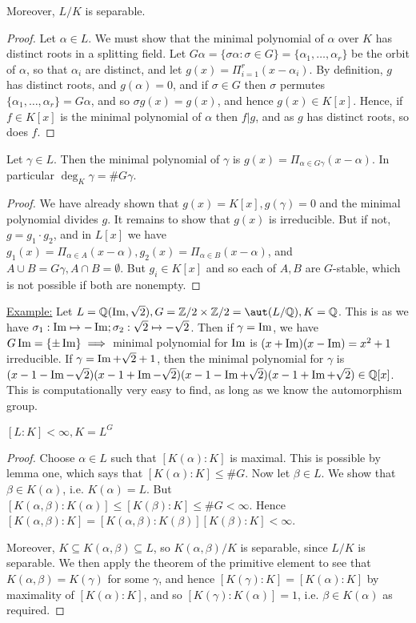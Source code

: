 \documentclass[a4paper, 10pt, twocolumn]{amsart}
\begin{document}
\begin{lemma}
Moreover, $L/K$ is separable.
\end{lemma}
\begin{proof}
Let $\alpha \in L$. We must show that the minimal polynomial of $\alpha$ over $K$ has distinct roots in a splitting field. Let $G\alpha = \{\sigma\alpha : \sigma \in G\} = \{\alpha_1, \ldots, \alpha_r\}$ be the orbit of $\alpha$, so that $\alpha_i$ are distinct, and let $g(x) = \Pi_{i=1}^r (x-\alpha_i).$ By definition, $g$ has distinct roots, and $g(\alpha) = 0$, and if $\sigma \in G$ then $\sigma$ permutes $\{\alpha_1, \ldots, \alpha_r\} = G\alpha$, and so $\sigma g(x) = g(x)$, and hence $g(x) \in K[x]$. Hence, if $f \in K[x]$ is the minimal polynomial of $\alpha$ then $f|g$, and as $g$ has distinct roots, so does $f$.
\end{proof}
\begin{lemma}
Let $\gamma \in L$. Then the minimal polynomial of $\gamma$ is $g(x) = \Pi_{\alpha \in G\gamma} (x-\alpha)$. In particular $\deg_K \gamma = \# G\gamma$.
\end{lemma}
\begin{proof}
We have already shown that $g(x) = K[x], g(\gamma) = 0$ and the minimal polynomial divides $g$. It remains to show that $g(x)$ is irreducible. But if not, $g = g_1 \cdot g_2$, and in $L[x]$ we have $g_1(x) = \Pi_{\alpha \in A} (x-\alpha), g_2(x) = \Pi_{\alpha\in B} (x-\alpha)$, and $A \cup B = G\gamma, A \cap B = \emptyset$. But $g_i \in K[x]$ and so each of $A, B$ are $G$-stable, which is not possible if both are nonempty.
\end{proof}
\underline{Example:} Let $L = \Q(\im, \sqrt{2}), G = \Z/2 \times \Z/2 = \aut (L/\Q), K = \Q$. This is as we have $\sigma_1: \operatorname{Im} \mapsto -\operatorname{Im}; \sigma_2: \sqrt{2} \mapsto -\sqrt{2}$. Then if $\gamma= \operatorname{Im}$, we have $G \operatorname{Im} = \{\pm \operatorname{Im}\} \implies$ minimal polynomial for $\operatorname{Im}$ is $(x+\operatorname{Im})(x-\operatorname{Im}) = x^2+1$ irreducible. If $\gamma = \operatorname{Im} + \sqrt{2} + 1$, then the minimal polynomial for $\gamma$ is $(x-1-\operatorname{Im}-\sqrt{2})(x-1+\operatorname{Im}-\sqrt{2})(x-1-\operatorname{Im}+\sqrt{2})(x-1+\operatorname{Im}+\sqrt{2}) \in \mathbb{Q}[x]$. This is computationally very easy to find, as long as we know the automorphism group.
\begin{lemma}
$[L:K] <\infty, K = L^G$
\end{lemma}
\begin{proof}
Choose $\alpha \in L$ such that $[K(\alpha):K]$ is maximal. This is possible by lemma one, which says that $[K(\alpha):K] \leq \#G$. Now let $\beta \in L$. We show that $\beta \in K(\alpha)$, i.e. $K(\alpha) = L$. But $[K(\alpha,\beta):K(\alpha)] \leq [K(\beta):K] \leq \#G <\infty$. Hence $[K(\alpha,\beta):K] = [K(\alpha,\beta):K(\beta)][K(\beta):K] <\infty$.

Moreover, $K \subseteq K(\alpha,\beta) \subseteq L$, so $K(\alpha, \beta)/K$ is separable, since $L/K$ is separable. We then apply the theorem of the primitive element to see that $K(\alpha, \beta) = K(\gamma)$ for some $\gamma$, and hence $[K(\gamma):K] = [K(\alpha):K]$ by maximality of $[K(\alpha):K]$, and so $[K(\gamma):K(\alpha)] = 1$, i.e. $\beta \in K(\alpha)$ as required.
\end{proof}
\end{document}
